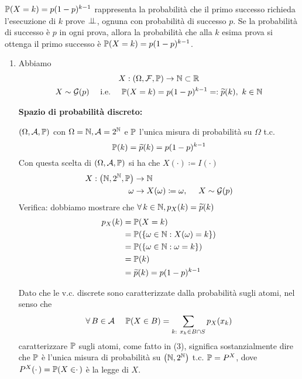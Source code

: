 \begin{rem}
$\mathbb{P}(X=k) =p(1-p)^{k-1}$ rappresenta la probabilità che il primo successo richieda l'esecuzione di $k$ prove $\perp \!\!\! \perp $, ognuna con probabilità di successo $p$. Se la probabilità di successo è $p$ in ogni prova, allora la probabilità che alla $k$ esima prova si ottenga il primo successo è $\mathbb{P}(X=k) =p(1-p)^{k-1}$.
\end{rem}
\begin{enumerate}
\item Abbiamo
\begin{gather*}
X:(\Omega ,\mathcal{F} ,\mathbb{P})\rightarrow \mathbb{N} \subset \mathbb{R}\\
X\sim \mathcal{G}(p) \ \ \ \ \text{i.e.} \ \ \ \ \mathbb{P}(X=k) =p(1-p)^{k-1} =:\widetilde{p}(k) ,\ k\in \mathbb{N}
\end{gather*}

\textbf{Spazio di probabilità discreto:}

$(\Omega,\mathcal{A},\mathbb{P})$ con $\Omega =\mathbb{N} ,\mathcal{A} =2^{\mathbb{N}}$ e $\mathbb{P}$ l'unica misura di probabilità su $\Omega $ t.c.
\begin{equation}
\mathbb{P}(k) =\widetilde{p}(k) =p(1-p)^{k-1}
\end{equation}
Con questa scelta di $(\Omega,\mathcal{A},\mathbb{P})$ si ha che $X(\cdotp) \coloneqq I(\cdotp)$
\begin{align*}
X:\left(\mathbb{N} ,2^{\mathbb{N}} ,\mathbb{P}\right) & \rightarrow \mathbb{N}\\
\omega  & \rightarrow X(\omega) \coloneqq \omega ,\ \ \ \ X\sim \mathcal{G}(p)
\end{align*}
Verifica: dobbiamo mostrare che $\forall k\in \NN ,p_{X}(k) =\tilde{p}(k)$
\begin{align*}
p_{X}(k) & =\mathbb{P}(X=k)\\
 & =\mathbb{P}(\{\omega \in \mathbb{N} :X(\omega) =k\})\\
 & =\mathbb{P}(\{\omega \in \mathbb{N} :\omega =k\})\\
 & =\mathbb{P}(k)\\
 & =\widetilde{p}(k) =p(1-p)^{k-1}
\end{align*}

\begin{rem}
Dato che le v.c. discrete sono caratterizzate dalla probabilità sugli atomi, nel senso che
\begin{equation*}
\forall B\in \Ac \ \ \ \ \PP(X\in B) =\sum\limits_{k:\ x_{k} \in B\cap S} p_{X}(x_{k})
\end{equation*}
caratterizzare $\mathbb{P}$ sugli atomi, come fatto in (3), significa sostanzialmente dire che $\mathbb{P}$ è l'unica misura di probabilità su $\left(\mathbb{N} ,2^{\mathbb{N}}\right)$ t.c. $\mathbb{P} =P^{X}$, dove $P^{X}(\cdotp) =\mathbb{P}(X\in \cdotp)$ è la legge di $X$.


\end{rem}
\end{enumerate}
